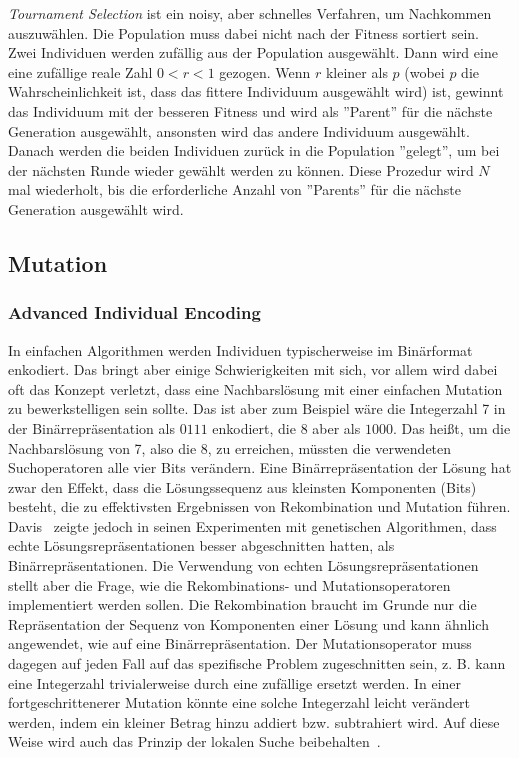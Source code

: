 \documentclass{article}
\begin{document}
\textit{Tournament Selection} ist ein noisy, aber schnelles Verfahren, um Nachkommen auszuwählen. Die Population muss dabei nicht nach der Fitness sortiert sein. Zwei Individuen werden zufällig aus der Population ausgewählt. Dann wird eine eine zufällige reale Zahl $0 < r < 1$ gezogen. Wenn $r$ kleiner als $p$ (wobei $p$ die Wahrscheinlichkeit ist, dass das fittere Individuum ausgewählt wird) ist, gewinnt das Individuum mit der besseren Fitness und wird als ''Parent'' für die nächste Generation ausgewählt, ansonsten wird das andere Individuum ausgewählt. Danach werden die beiden Individuen zurück in die Population ''gelegt'', um bei der nächsten Runde wieder gewählt werden zu können. Diese Prozedur wird $N$ mal wiederholt, bis die erforderliche Anzahl von ''Parents'' für die nächste Generation ausgewählt wird. 


\subsection{Mutation}

\subsubsection{Advanced Individual Encoding}
In einfachen Algorithmen werden Individuen typischerweise im Binärformat enkodiert. Das bringt aber einige Schwierigkeiten mit sich, vor allem wird dabei oft das Konzept verletzt, dass eine Nachbarslösung mit einer einfachen Mutation zu bewerkstelligen sein sollte. Das ist aber zum Beispiel wäre die Integerzahl 7 in der Binärrepräsentation als $0111$ enkodiert, die 8 aber als $1000$. Das heißt, um die Nachbarslösung von 7, also die 8, zu erreichen, müssten die verwendeten Suchoperatoren alle vier Bits verändern. Eine Binärrepräsentation der Lösung hat zwar den Effekt, dass die Lösungssequenz aus kleinsten Komponenten (Bits) besteht, die zu effektivsten Ergebnissen von Rekombination und Mutation führen. Davis~\cite{Davis1991} zeigte jedoch in seinen Experimenten mit genetischen Algorithmen, dass echte Lösungsrepräsentationen besser abgeschnitten hatten, als Binärrepräsentationen. Die Verwendung von echten Lösungsrepräsentationen stellt aber die Frage, wie die Rekombinations- und Mutationsoperatoren implementiert werden sollen. Die Rekombination braucht im Grunde nur die Repräsentation der Sequenz von Komponenten einer Lösung und kann ähnlich angewendet, wie auf eine Binärrepräsentation. Der Mutationsoperator muss dagegen auf jeden Fall auf das spezifische Problem zugeschnitten sein, z. B. kann eine Integerzahl trivialerweise durch eine zufällige ersetzt werden. In einer fortgeschrittenerer Mutation könnte eine solche Integerzahl leicht verändert werden, indem ein kleiner Betrag hinzu addiert bzw. subtrahiert wird. Auf diese Weise wird auch das Prinzip der lokalen Suche beibehalten~\cite{Davis1991}. 
\end{document}
